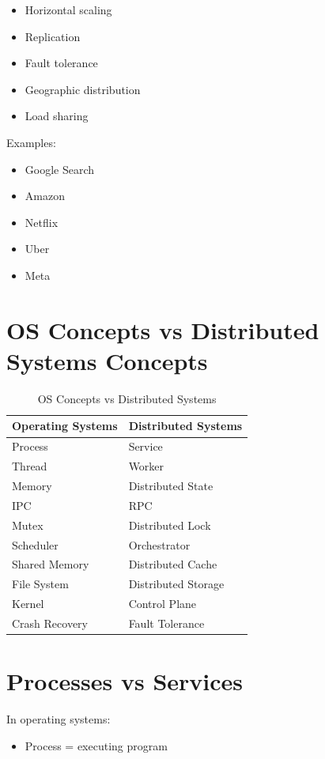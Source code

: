 \begin{itemize}
\item Horizontal scaling
\item Replication
\item Fault tolerance
\item Geographic distribution
\item Load sharing
\end{itemize}

Examples:

\begin{itemize}
\item Google Search
\item Amazon
\item Netflix
\item Uber
\item Meta
\end{itemize}

\section{OS Concepts vs Distributed Systems Concepts}

\begin{table}[H]
\centering
\begin{tabular}{ll}
\toprule
Operating Systems & Distributed Systems \\
\midrule
Process & Service \\
Thread & Worker \\
Memory & Distributed State \\
IPC & RPC \\
Mutex & Distributed Lock \\
Scheduler & Orchestrator \\
Shared Memory & Distributed Cache \\
File System & Distributed Storage \\
Kernel & Control Plane \\
Crash Recovery & Fault Tolerance \\
\bottomrule
\end{tabular}
\caption{OS Concepts vs Distributed Systems}
\end{table}

\section{Processes vs Services}

In operating systems:

\begin{itemize}
\item Process = executing program
\end{itemize}

